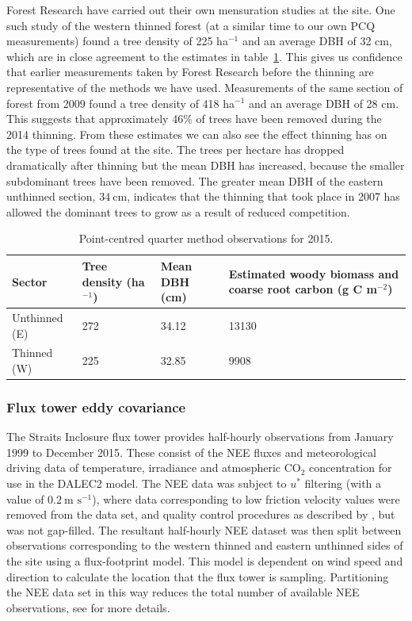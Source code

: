 \documentclass[draft,linenumbers]{agujournal}
\begin{document}
Forest Research have carried out their own mensuration studies at the site. One such study of the western thinned forest (at a similar time to our own PCQ measurements) found a tree density of 225 ha\(^{-1}\) and an average DBH of 32 cm, which are in close agreement to the estimates in table~\ref{table:cwoo_obs}. This gives us confidence that earlier measurements taken by Forest Research before the thinning are representative of the methods we have used. Measurements of the same section of forest from 2009 found a tree density of 418 ha\(^{-1}\) and an average DBH of 28 cm. This suggests that approximately 46\% of trees have been removed during the 2014 thinning. From these estimates we can also see the effect thinning has on the type of trees found at the site. The trees per hectare has dropped dramatically after thinning but the mean DBH has increased, because the smaller subdominant trees have been removed. The greater mean DBH of the eastern unthinned section, \(34~\text{cm}\), indicates that the thinning that took place in 2007 has allowed the dominant trees to grow as a result of reduced competition.

\begin{table}[ht] 
	\caption{Point-centred quarter method observations for 2015.}
\begin{center}
	\begin{tabular}{| l | p{2cm} | p{2cm} | p{4.5cm} |}
	\hline
	Sector & Tree density (ha\(^{-1}\)) & Mean DBH (cm) & Estimated woody biomass and coarse root carbon (g C m\(^{-2}\)) \\ \hline
	Unthinned (E) & 272 & 34.12 & 13130 \\ \hline
	Thinned (W) & 225 & 32.85 & 9908 \\ \hline
	\end{tabular}
	\label{table:cwoo_obs}
\end{center} 
\end{table}

\subsubsection{Flux tower eddy covariance} \label{sec:eddycov} 

The Straits Inclosure flux tower provides half-hourly observations from January 1999 to December 2015. These consist of the NEE fluxes and meteorological driving data of temperature, irradiance and atmospheric CO\(_{2}\) concentration for use in the DALEC2 model. The NEE data was subject to \(u^*\) filtering (with a value of \(0.2~\text{m s}^{-1}\)), {\color{blue}where data corresponding to low friction velocity values were removed from the data set}, and quality control procedures as described by \citet{papale2006towards}, but was not gap-filled. The resultant half-hourly NEE dataset was then split between observations corresponding to the western thinned and eastern unthinned sides of the site using a flux-footprint model. {\color{blue}This model is dependent on wind speed and direction to calculate the location that the flux tower is sampling. Partitioning the NEE data set in this way reduces the total number of available NEE observations, see \citet{wilkinson2015effects} for more details.  }
\end{document}
